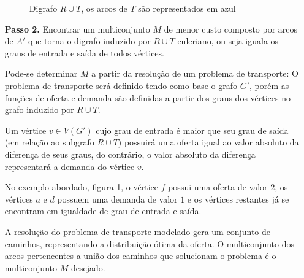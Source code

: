 \documentclass[12pt, a4paper]{article}
\begin{document}
\begin{enumerate}
\begin{figure}[H]
            \caption{Digrafo $R\cup T$, os arcos de $T$ são representados em azul}
            \label{graphRUT}
        \end{figure}


        \item[\textbf{Passo 2.}]
            Encontrar um multiconjunto $M$ de menor custo composto por arcos de $A'$ que torna o digrafo induzido por $R \cup T$ euleriano, ou seja iguala os graus de entrada e saída de todos vértices.

			Pode-se determinar $M$ a partir da resolução de um problema de transporte: 
            O problema de transporte será definido tendo como base o grafo $G'$, porém as funções de oferta e demanda são definidas a partir dos graus dos vértices no grafo induzido por $R \cup T$.

            Um vértice $v \in V(G')$ cujo grau de entrada é maior que seu grau de saída (em relação ao subgrafo $R \cup T$) possuirá uma oferta igual ao valor absoluto da diferença de seus graus, do contrário, o valor absoluto da diferença representará a demanda do vértice $v$.

            No exemplo abordado, figura \ref{graphRUT}, o vértice $f$ possui uma oferta de valor $2$, os vértices $a$ e $d$ possuem uma demanda de valor $1$ e os vértices restantes já se encontram em igualdade de grau de entrada e saída.

			A resolução do problema de transporte modelado gera um conjunto de caminhos, representando a distribuição ótima da oferta. 
            O multiconjunto dos arcos pertencentes a união dos caminhos que solucionam o problema é o multiconjunto $M$ desejado.


\end{enumerate}
\end{document}
